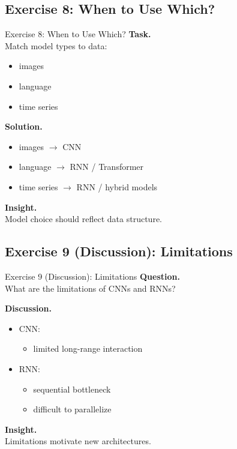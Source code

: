 \documentclass[aspectratio=169,11pt]{beamer}
\begin{document}
\subsection{Exercise 8: When to Use Which?}
\begin{frame}[t,allowframebreaks]{Exercise 8: When to Use Which?}
\small
\textbf{Task.}\\ Match model types to data:

\begin{itemize}
    \item images
    \item language
    \item time series
\end{itemize}

\textbf{Solution.}\\ \begin{itemize}
    \item images $\rightarrow$ CNN
    \item language $\rightarrow$ RNN / Transformer
    \item time series $\rightarrow$ RNN / hybrid models
\end{itemize}

\textbf{Insight.}\\ Model choice should reflect data structure.
\end{frame}

\subsection{Exercise 9 (Discussion): Limitations}
\begin{frame}[t,allowframebreaks]{Exercise 9 (Discussion): Limitations}
\small
\textbf{Question.}\\ What are the limitations of CNNs and RNNs?

\textbf{Discussion.}\\ \begin{itemize}
    \item CNN:
    \begin{itemize}
        \item limited long-range interaction
    \end{itemize}

    \item RNN:
    \begin{itemize}
        \item sequential bottleneck
        \item difficult to parallelize
    \end{itemize}
\end{itemize}

\textbf{Insight.}\\ Limitations motivate new architectures.
\end{frame}
\end{document}

